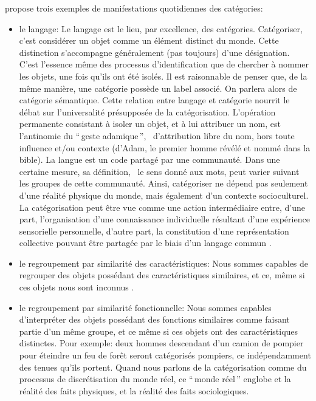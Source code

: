 \citep{anderson1991adaptive} propose trois exemples de manifestations quotidiennes des catégories:

\begin{itemize}

\item le langage: Le langage est le lieu, par excellence, des catégories. Catégoriser, c'est considérer un objet comme un élément distinct du monde. Cette distinction s'accompagne généralement (pas toujours) d'une désignation. C'est l'essence même des processus d'identification que de chercher à nommer les objets, une fois qu'ils ont été isolés. Il est raisonnable de penser que, de la même manière, une catégorie possède un label associé. On parlera alors de catégorie sémantique. Cette relation entre langage et catégorie nourrit le débat sur l'universalité présupposée de la catégorisation. L'opération permanente consistant à isoler un objet, et à lui attribuer un nom, est l'antinomie du ``\,geste adamique\,'', \ie~d'attribution libre du nom, hors toute influence et/ou contexte (d'Adam, le premier homme révélé et nommé dans la bible). La langue est un code partagé par une communauté. Dans une certaine mesure, sa définition, \ie~le sens donné aux mots, peut varier suivant les groupes de cette communauté. Ainsi, catégoriser ne dépend pas seulement d'une réalité physique du monde, mais également d'un contexte socioculturel. La catégorisation peut être vue comme une action intermédiaire entre, d'une part, l'organisation d'une connaissance individuelle résultant d'une expérience sensorielle personnelle, d'autre part, la constitution d'une représentation collective pouvant être partagée par le biais d'un langage commun \citep{dubois2006cognitive}.
\item le regroupement par similarité des caractéristiques: Nous sommes capables de regrouper des objets possédant des caractéristiques similaires, et ce, même si ces objets nous sont inconnus \citep{fried1984induction}.
\item le regroupement par similarité fonctionnelle: Nous sommes capables d'interpréter des objets possédant des fonctions similaires comme faisant partie d'un même groupe, et ce même si ces objets ont des caractéristiques distinctes. Pour exemple: deux hommes descendant d'un camion de pompier pour éteindre un feu de forêt seront catégorisés pompiers, ce indépendamment des tenues qu'ils portent. Quand nous parlons de la catégorisation comme du processus de discrétisation du monde réel, ce ``\,monde réel\,'' englobe et la réalité des faits physiques, et la réalité des faits sociologiques.
\end{itemize}

